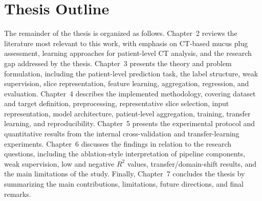 \section{Thesis Outline}
The remainder of the thesis is organized as follows. Chapter~2 reviews the literature most relevant to this work, with emphasis on CT-based mucus plug assessment, learning approaches for patient-level CT analysis, and the research gap addressed by the thesis. Chapter~3 presents the theory and problem formulation, including the patient-level prediction task, the label structure, weak supervision, slice representation, feature learning, aggregation, regression, and evaluation. Chapter~4 describes the implemented methodology, covering dataset and target definition, preprocessing, representative slice selection, input representation, model architecture, patient-level aggregation, training, transfer learning, and reproducibility. Chapter~5 presents the experimental protocol and quantitative results from the internal cross-validation and transfer-learning experiments. Chapter~6 discusses the findings in relation to the research questions, including the ablation-style interpretation of pipeline components, weak supervision, low and negative \(R^2\) values, transfer/domain-shift results, and the main limitations of the study. Finally, Chapter~7 concludes the thesis by summarizing the main contributions, limitations, future directions, and final remarks.


